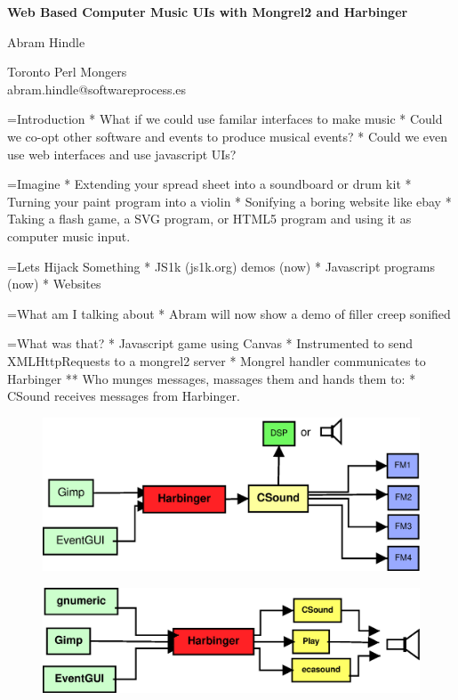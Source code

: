 \documentclass[titlepage,usenames,a4,landscape,semhelv]{seminar}
\author{
\names \\ 
{\small Toronto  Perl Mongers} \\
abram.hindle@softwareprocess.es
}
\newcommand{\gettitle}{Web Based Computer Music UIs with Mongrel2 and Harbinger}
\newcommand{\getmaintitle}{\gettitle}
\newcommand{\names}{Abram Hindle}
\begin{document}
\pagestyle{fancy} %
\begin{slide}

\begin{center}
{\bf \LARGE \getmaintitle }

{\names } 

{\small Toronto Perl Mongers} \\
abram.hindle@softwareprocess.es



\end{center}


=Introduction
* What if we could use familar interfaces to make music
* Could we co-opt other software and events to produce musical events?
* Could we even use web interfaces and use javascript UIs?

=Imagine
* Extending your spread sheet into a soundboard or drum kit
* Turning your paint program into a violin
* Sonifying a boring website like ebay
* Taking a flash game, a SVG program, or HTML5 program and using it as
computer music input.

=Lets Hijack Something
* JS1k (js1k.org) demos (now)
* Javascript programs (now)
* Websites

=What am I talking about
* Abram will now show a demo of filler creep sonified

=What was that?
* Javascript game using Canvas
* Instrumented to send XMLHttpRequests to a mongrel2 server
* Mongrel handler communicates to Harbinger
** Who munges messages, massages them and hands them to:
* CSound receives messages from Harbinger.

\newslide

\begin{figure}
  \centering
\includegraphics[width=\textwidth]{harbinger}  
\end{figure}

\newslide

\begin{figure}
  \centering
\includegraphics[width=\textwidth]{harbinger-example}  
\end{figure}


\end{slide}
\end{document}
